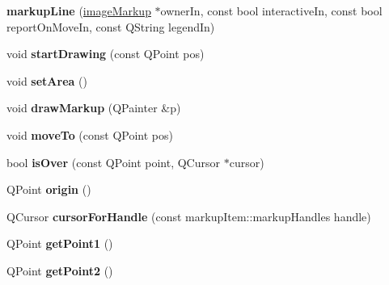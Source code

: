 \begin{DoxyCompactItemize}
\item 
\hypertarget{classmarkupLine_a7a95e10ba3e4bda75e0c260ee6f95bd6}{
{\bfseries markupLine} (\hyperlink{classimageMarkup}{imageMarkup} $\ast$ownerIn, const bool interactiveIn, const bool reportOnMoveIn, const QString legendIn)}
\label{classmarkupLine_a7a95e10ba3e4bda75e0c260ee6f95bd6}

\item 
\hypertarget{classmarkupLine_a8164baa9961994148a13913a5186e711}{
void {\bfseries startDrawing} (const QPoint pos)}
\label{classmarkupLine_a8164baa9961994148a13913a5186e711}

\item 
\hypertarget{classmarkupLine_ac9999d4b2b96dd27cb05dc91d5211f86}{
void {\bfseries setArea} ()}
\label{classmarkupLine_ac9999d4b2b96dd27cb05dc91d5211f86}

\item 
\hypertarget{classmarkupLine_a923b6fc4a18acfcd883f24f38ca07119}{
void {\bfseries drawMarkup} (QPainter \&p)}
\label{classmarkupLine_a923b6fc4a18acfcd883f24f38ca07119}

\item 
\hypertarget{classmarkupLine_a939e2c560f454796212f0fceea50d387}{
void {\bfseries moveTo} (const QPoint pos)}
\label{classmarkupLine_a939e2c560f454796212f0fceea50d387}

\item 
\hypertarget{classmarkupLine_a76abf1570968523b650b9fd4f94cc9ff}{
bool {\bfseries isOver} (const QPoint point, QCursor $\ast$cursor)}
\label{classmarkupLine_a76abf1570968523b650b9fd4f94cc9ff}

\item 
\hypertarget{classmarkupLine_a2167abf14c5eba07ceb0041fe688fb7b}{
QPoint {\bfseries origin} ()}
\label{classmarkupLine_a2167abf14c5eba07ceb0041fe688fb7b}

\item 
\hypertarget{classmarkupLine_ad2fc7a98e9f20c7e532128d3f9d1f262}{
QCursor {\bfseries cursorForHandle} (const markupItem::markupHandles handle)}
\label{classmarkupLine_ad2fc7a98e9f20c7e532128d3f9d1f262}

\item 
\hypertarget{classmarkupLine_a22d3223e43b1fa36745d3b5febcda12c}{
QPoint {\bfseries getPoint1} ()}
\label{classmarkupLine_a22d3223e43b1fa36745d3b5febcda12c}

\item 
\hypertarget{classmarkupLine_a9b73e9f256d6661a97a51b0f17ea532b}{
QPoint {\bfseries getPoint2} ()}
\label{classmarkupLine_a9b73e9f256d6661a97a51b0f17ea532b}


\end{DoxyCompactItemize}
